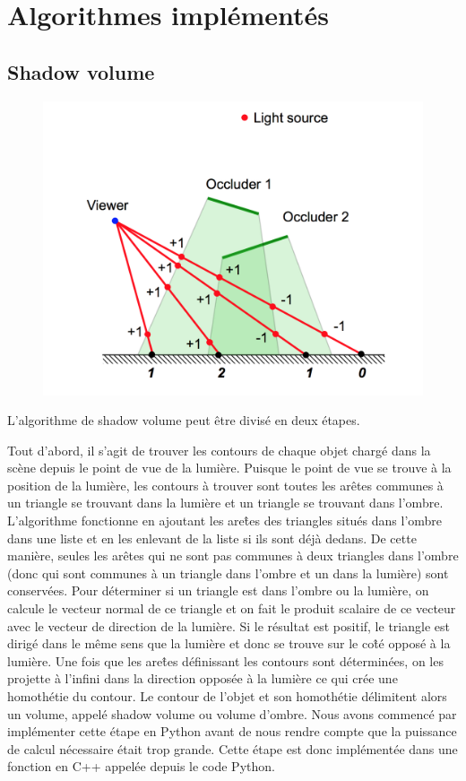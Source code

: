\documentclass[a4paper,10pt]{report}
\begin{document}
\section{Algorithmes implémentés} 

\subsection{Shadow volume}

\begin{figure}[H]
\includegraphics[scale=0.32]{images/shadow_volume.png}
\centering
{}
\end{figure}
L'algorithme de shadow volume peut être divisé en deux étapes.

Tout d'abord, il s'agit de trouver les contours de chaque objet chargé dans la scène depuis le point de vue de la lumière. 
Puisque le point de vue se trouve à la position de la lumière, les contours à trouver sont toutes les arêtes communes à un triangle se trouvant dans la lumière et un triangle se trouvant dans l'ombre. 
L'algorithme fonctionne en ajoutant les are\^tes des triangles situés dans l'ombre dans une liste et en les enlevant de la liste si ils sont déjà dedans.
De cette manière, seules les arêtes qui ne sont pas communes à deux triangles dans l'ombre (donc qui sont communes à un triangle dans l'ombre et un dans la lumière) sont conservées.
Pour déterminer si un triangle est dans l'ombre ou la lumière, on calcule le vecteur normal de ce triangle et on fait le produit scalaire de ce vecteur avec le vecteur de direction de la lumière. Si le résultat est positif, le triangle est dirigé dans le même sens que la lumière et donc se trouve sur le co\^té opposé à la lumière.
Une fois que les are\^tes définissant les contours sont déterminées, on les projette à l'infini dans la direction opposée à la lumière ce qui crée une homothétie du contour. Le contour de l'objet et son homothétie délimitent alors un volume, appelé shadow volume ou volume d'ombre. 
Nous avons commencé par implémenter cette étape en Python avant de nous rendre compte que la puissance de calcul nécessaire était trop grande.
Cette étape est donc implémentée dans une fonction en C++ appelée depuis le code Python.
\end{document}
